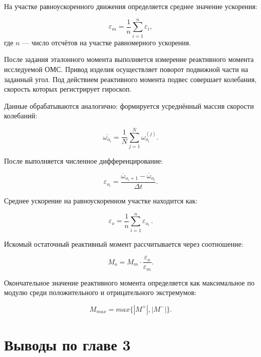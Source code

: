 На участке равноускоренного движения определяется среднее значение ускорения:


\begin{equation}
	\label{eq:acc}
	\varepsilon_m = \frac{1}{n}\sum_{i=1}^{n} \varepsilon_{i},
\end{equation}
где \(n\) --- число отсчётов на участке равномерного ускорения.

После задания эталонного момента выполняется измерение реактивного момента исследуемой ОМС. Привод изделия осуществляет поворот подвижной части на заданный угол. Под действием реактивного момента подвес совершает колебания, скорость которых  регистрирует гироскоп.

Данные обрабатываются аналогично: формируется усреднённый массив скорости колебаний:

\begin{equation}
	\label{eq:omega_op}
	\overline{\omega_{o_i}}
	= \frac{1}{N}\sum_{j=1}^{N} \omega_{o_i}^{(j)}.
\end{equation}

После выполняется численное дифференцирование:

\begin{equation}
	\label{eq:epsilon_op}
	\varepsilon_{o_i}
	= \frac{\overline{\omega}_{o_i+1}
		- \overline{\omega}_{o_i}}{\Delta t}.
\end{equation}

Среднее ускорение на равноускоренном участке находится как:

\begin{equation}
	\label{eq:epsilon_op_mean}
	\varepsilon_{o}
	= \frac{1}{n}\sum_{i=1}^{n} \varepsilon_{o_i}\,.
\end{equation}

Искомый остаточный реактивный момент рассчитывается через соотношение:

\begin{equation}
	\label{eq:Mom}
	M_o = M_m \cdot \frac{\varepsilon_o}{\varepsilon_m}.
\end{equation}

Окончательное значение реактивного момента определяется как максимальное по модулю среди положительного и отрицательного экстремумов:

\begin{equation}
	\label{eq:Mom}
	M_{max} = max\{|M^+|, |M^-|\}.
\end{equation}






\section*{Выводы по главе 3}

